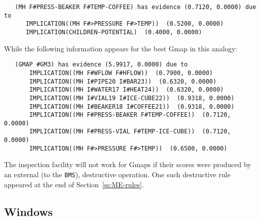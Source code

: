 \begin{small}
\begin{verbatim}
   (MH F#PRESS-BEAKER F#TEMP-COFFEE) has evidence (0.7120, 0.0000) due to
      IMPLICATION((MH F#>PRESSURE F#>TEMP))  (0.5200, 0.0000)
      IMPLICATION(CHILDREN-POTENTIAL)  (0.4000, 0.0000)
\end{verbatim}
\end{small}
\noindent
While the following information appears for the best Gmap in this analogy:
\begin{small}
\begin{verbatim}
   (GMAP #GM3) has evidence (5.9917, 0.0000) due to
       IMPLICATION((MH F#WFLOW F#HFLOW))  (0.7900, 0.0000)
       IMPLICATION((MH I#PIPE20 I#BAR23))  (0.6320, 0.0000)
       IMPLICATION((MH I#WATER17 I#HEAT24))  (0.6320, 0.0000)
       IMPLICATION((MH I#VIAL19 I#ICE-CUBE22))  (0.9318, 0.0000)
       IMPLICATION((MH I#BEAKER18 I#COFFEE21))  (0.9318, 0.0000)
       IMPLICATION((MH F#PRESS-BEAKER F#TEMP-COFFEE))  (0.7120, 0.0000)
       IMPLICATION((MH F#PRESS-VIAL F#TEMP-ICE-CUBE))  (0.7120, 0.0000)
       IMPLICATION((MH F#>PRESSURE F#>TEMP))  (0.6500, 0.0000)
\end{verbatim}
\end{small}

\noindent
The inspection facility will not work for Gmaps if their scores were
produced by an external (to the {\tt BMS}), destructive operation. One such
destructive rule appeared at the end of Section~\ref{ss:ME-rules}.


\subsection{Windows}

\indent
{}



